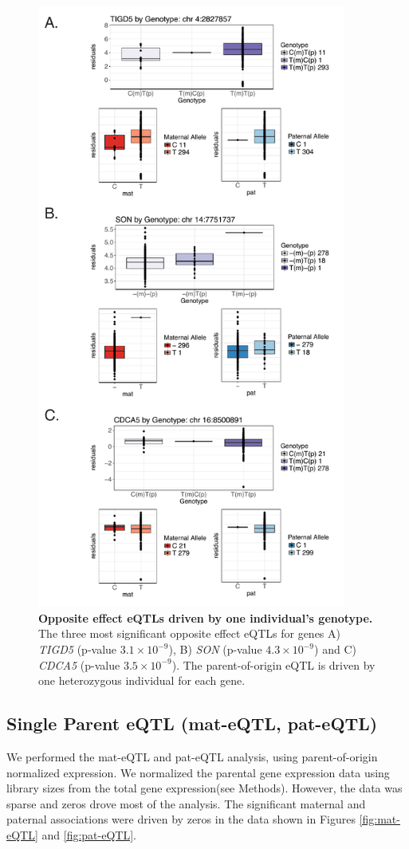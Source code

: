 \begin{figure}[!htb]
\centering \includegraphics[width=4in]{img/ch04/fig-01-oeQTLs.pdf}
\caption[Opposite effect eQTLs driven by one individual's genotype.]{\textbf{Opposite effect eQTLs driven by one individual's genotype.} The three most significant opposite effect eQTLs for genes A) \emph{TIGD5} (p-value $ 3.1 \times 10^{-9} $), B) \emph{SON} (p-value $4.3 \times 10^{-9} $) and C) \emph{CDCA5} (p-value $3.5 \times 10^{-9} $). The parent-of-origin eQTL is driven by one heterozygous individual for each gene.}
\label{fig:oeQTL}
\end{figure}
\clearpage

\subsection{Single Parent eQTL (mat-eQTL, pat-eQTL)}\label{Single Parent eQTL (mat-eQTL, pat-eQTL)} 
We performed the mat-eQTL and pat-eQTL analysis, using parent-of-origin normalized expression. We normalized the parental gene expression data using library sizes from the total gene expression(see Methods). However, the data was sparse and zeros drove most of the analysis. The significant maternal and paternal associations were driven by zeros in the data shown in Figures \ref{fig:mat-eQTL} and \ref{fig:pat-eQTL}. 

